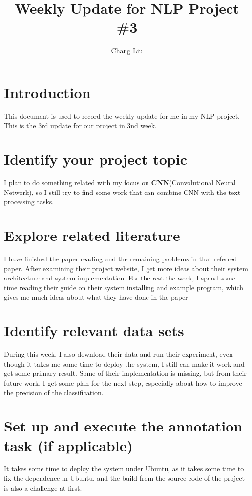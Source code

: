 \documentclass{article}
\title{Weekly Update for NLP Project \#3}
\author{Chang Liu}
\date{\datedate}
\begin{document}
\maketitle

\section{Introduction}


This document is used to record the weekly update for me in my NLP project. This is the 3rd update for our project in 3nd week.

\section{Identify your project topic}

I plan to do something related with my focus on \textbf{CNN}(Convolutional Neural Network), so I still try to find some work that can combine CNN with the text processing tasks.

\section{Explore related literature} 
I have finished the paper reading and the remaining problems in that referred paper. After examining their project website, I get more ideas about their system architecture and system implementation. For the rest the week, I spend some time reading their guide on their system installing and example program, which gives me much ideas about what they have done in the paper


\section{Identify relevant data sets}

During this week, I also download their data and run their experiment, even though it takes me some time to deploy the system, I still can make it work and get some primary result. Some of their implementation is missing, but from their future work, I get some plan for the next step, especially about how to improve the precision of the classification.



\section{Set up and execute the annotation task (if applicable)} 
It takes some time to deploy the system under Ubuntu, as it takes some time to fix the dependence in Ubuntu, and the build from the source code of the project is also a challenge at first.
\end{document}
